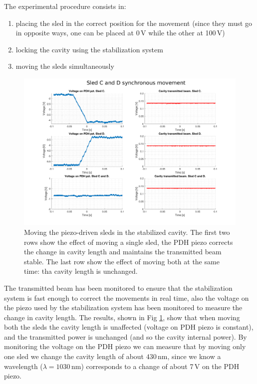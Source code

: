 The experimental procedure consists in:
\begin{enumerate}
	\item placing the sled in the correct position for the movement (since they must go in opposite ways, one can be placed at 0\,V while the other at 100\,V)
	\item locking the cavity using the stabilization system
	\item moving the sleds simultaneously 
\end{enumerate}
\begin{figure}
	\centering
	\includegraphics[width=0.9\linewidth]{images/smaractmove.pdf}
	\caption{Moving the piezo-driven sleds in the stabilized cavity. The first two rows show the effect of moving a single sled, the PDH piezo corrects the change in cavity length and maintains the transmitted beam stable. The last row show the effect of moving both at the same time: tha cavity length is unchanged.}
	\label{fig:smaractmove}
\end{figure}

The transmitted beam has been monitored to ensure that the stabilization system is fast enough to correct the movements in real time, also the voltage on the piezo used by the stabilization system has been monitored to measure the change in cavity length. The results, shown in Fig \ref{fig:smaractmove}, show that when moving both the sleds the cavity length is unaffected (voltage on PDH piezo is constant), and the transmitted power is unchanged (and so the cavity internal power). By monitoring the voltage on the PDH piezo we can measure that by moving only one sled we change the cavity length of about $430\,$nm, since we know a wavelength ($\lambda = 1030\,$nm) corresponds to a change of about 7\,V on the PDH piezo.

